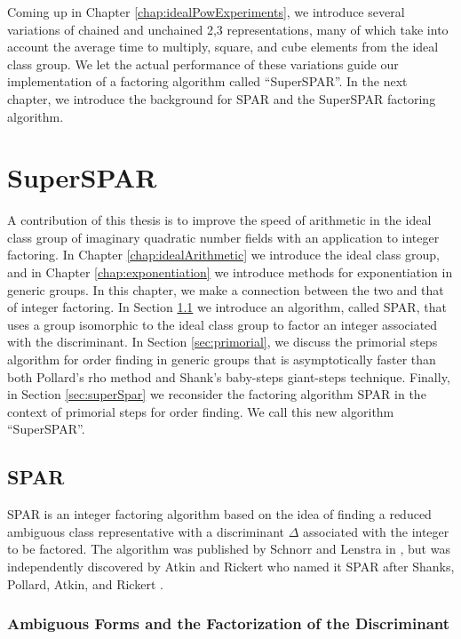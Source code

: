 \documentclass{ucalgthes1}
\theoremstyle{definition}
\begin{document}
Coming up in Chapter \ref{chap:idealPowExperiments}, we introduce several variations of chained and unchained 2,3 representations, many of which take into account the average time to multiply, square, and cube elements from the ideal class group.  We let the actual performance of these variations guide our implementation of a factoring algorithm called ``SuperSPAR''.  In the next chapter, we introduce the background for SPAR and the SuperSPAR factoring algorithm.


\chapter{SuperSPAR}
\label{chap:superspar}

A contribution of this thesis is to improve the speed of arithmetic in the ideal class group of imaginary quadratic number fields with an application to integer factoring.  In Chapter \ref{chap:idealArithmetic} we introduce the ideal class group, and in Chapter \ref{chap:exponentiation} we introduce methods for exponentiation in generic groups.  In this chapter, we make a connection between the two and that of integer factoring.  In Section \ref{sec:spar} we introduce an algorithm, called SPAR, that uses a group isomorphic to the ideal class group to factor an integer associated with the discriminant.  In Section \ref{sec:primorial}, we discuss the primorial steps algorithm for order finding in generic groups that is asymptotically faster than both Pollard's rho method and Shank's baby-steps giant-steps technique.  Finally, in Section \ref{sec:superSpar} we reconsider the factoring algorithm SPAR in the context of primorial steps for order finding.  We call this new algorithm ``SuperSPAR''.

\section{SPAR}
\label{sec:spar}

SPAR is an integer factoring algorithm based on the idea of finding a reduced ambiguous class representative with a discriminant $\Delta$ associated with the integer to be factored.  The algorithm was published by Schnorr and Lenstra in \cite{Schnorr1984}, but was independently discovered by Atkin and Rickert who named it SPAR after Shanks, Pollard, Atkin, and Rickert \cite[p.182]{Jacobson1999}.

\subsection{Ambiguous Forms and the Factorization of the Discriminant}
\label{subsec:forms}
\end{document}
